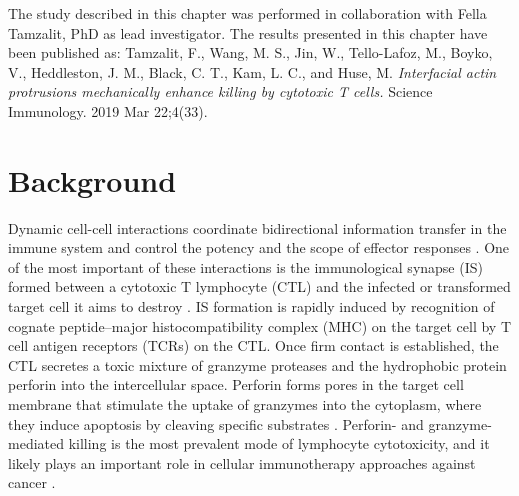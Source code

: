 The study described in this chapter was performed in collaboration with Fella Tamzalit, PhD as lead investigator. The results presented in this chapter have been published as: Tamzalit, F., Wang, M. S., Jin, W., Tello-Lafoz, M., Boyko, V., Heddleston, J. M., Black, C. T., Kam, L. C., and Huse, M.  \textit{Interfacial actin protrusions mechanically enhance killing by cytotoxic T cells.} Science Immunology. 2019 Mar 22;4(33).

\section{Background}
Dynamic cell-cell interactions coordinate bidirectional information transfer in the immune system and control the potency and the scope of effector responses \cite{Batista2013}. One of the most important of these interactions is the immunological synapse (IS) formed between a cytotoxic T lymphocyte (CTL) and the infected or transformed target cell it aims to destroy \cite{Dustin2010, Stinchcombe2007}. IS formation is rapidly induced by recognition of cognate peptide–major histocompatibility complex (MHC) on the target cell by T cell antigen receptors (TCRs) on the CTL. Once firm contact is established, the CTL secretes a toxic mixture of granzyme proteases and the hydrophobic protein perforin into the intercellular space. Perforin forms pores in the target cell membrane that stimulate the uptake of granzymes into the cytoplasm, where they induce apoptosis by cleaving specific substrates \cite{Thiery2014}. Perforin- and granzyme- mediated killing is the most prevalent mode of lymphocyte cytotoxicity, and it likely plays an important role in cellular immunotherapy approaches against cancer \cite{Martinez-Lostao2015}.

